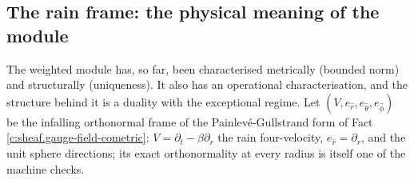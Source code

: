 \documentclass[11pt]{article}
\theoremstyle{definition}
\theoremstyle{plain}
\begin{document}
\subsection*{The rain frame: the physical meaning of the module}
\label{c:note.sheaf.setting-rain-frame-physical-meaning-module}
The weighted module has, so far, been characterised metrically (bounded norm) and structurally (uniqueness). It also has an operational characterisation, and the structure behind it is a duality with the exceptional regime. Let $(V, e_{\hat r}, e_{\hat\theta}, e_{\hat\phi})$ be the infalling orthonormal frame of the Painlev\'e-Gullstrand form of Fact \ref{c:sheaf.gauge-field-cometric}: $V = \partial_t - \beta\partial_r$ the rain four-velocity, $e_{\hat r} = \partial_r$, and the unit sphere directions; its exact orthonormality at every radius is itself one of the machine checks.
\end{document}
